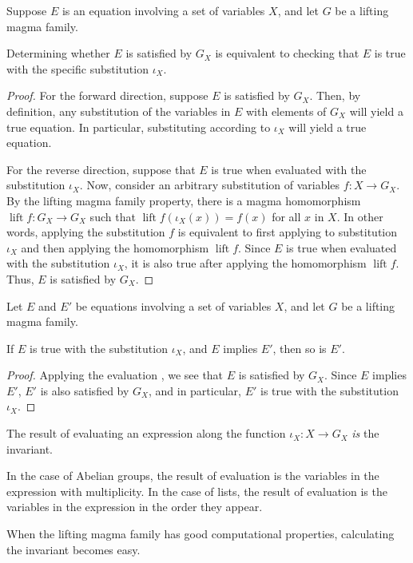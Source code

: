 \begin{theorem}\label{lifting-magma-basis-evaluation}
	Suppose $E$ is an equation involving a set of variables $X$, and let $G$ be a lifting magma family.

	Determining whether $E$ is satisfied by $G_X$ is equivalent to checking that $E$ is true with the specific substitution $\iota_X$.

\end{theorem}
\begin{proof}
	For the forward direction, suppose $E$ is satisfied by $G_X$. Then, by definition, any substitution of the variables in $E$ with elements of $G_X$ will yield a true equation. In particular, substituting according to $\iota_X$ will yield a true equation.

	For the reverse direction, suppose that $E$ is true when evaluated with the substitution $\iota_X$. Now, consider an arbitrary substitution of variables $f : X \to G_X$. By the lifting magma family property, there is a magma homomorphism $\operatorname{lift}{f} : G_X \to G_X$ such that $\operatorname{lift}{f}(\iota_X(x)) = f(x)$ for all $x$ in $X$. In other words, applying the substitution $f$ is equivalent to first applying to substitution $\iota_X$ and then applying the homomorphism $\operatorname{lift}{f}$. Since $E$ is true when evaluated with the substitution $\iota_X$, it is also true after applying the homomorphism $\operatorname{lift}{f}$. Thus, $E$ is satisfied by $G_X$.
\end{proof}

\begin{theorem}\label{fundamental-property-of-invariants}
	Let $E$ and $E'$ be equations involving a set of variables $X$, and let $G$ be a lifting magma family.

	If $E$ is true with the substitution $\iota_X$, and $E$ implies $E'$, then so is $E'$.
\end{theorem}
\begin{proof}
	Applying the evaluation , we see that $E$ is satisfied by $G_X$. Since $E$ implies $E'$, $E'$ is also satisfied by $G_X$, and in particular, $E'$ is true with the substitution $\iota_X$.
\end{proof}

\begin{remark}
	The result of evaluating an expression along the function $\iota_X : X \to G_X$ \emph{is} the invariant.

	In the case of Abelian groups, the result of evaluation is the variables in the expression with multiplicity.
	In the case of lists, the result of evaluation is the variables in the expression in the order they appear.

	When the lifting magma family has good computational properties, calculating the invariant becomes easy.
\end{remark}

